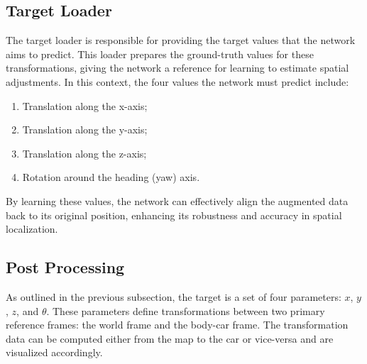 \subsection{Target Loader}
The target loader is responsible for providing the target values that the network aims to predict. This loader prepares the ground-truth values for these transformations, giving the network a reference for learning to estimate spatial adjustments. In this context, the four values the network must predict include:
\begin{enumerate}
    \item Translation along the x-axis;
    \item Translation along the y-axis;
    \item Translation along the z-axis;
    \item Rotation around the heading (yaw) axis.
\end{enumerate}
By learning these values, the network can effectively align the augmented data back to its original position, enhancing its robustness and accuracy in spatial localization.

\subsection{Post Processing}

As outlined in the previous subsection, the target is a set of four parameters: \( x \), \( y \), \( z \), and \( \theta \). These parameters define transformations between two primary reference frames: the world frame and the body-car frame. The transformation data can be computed either from the map to the car or vice-versa and are visualized accordingly.

